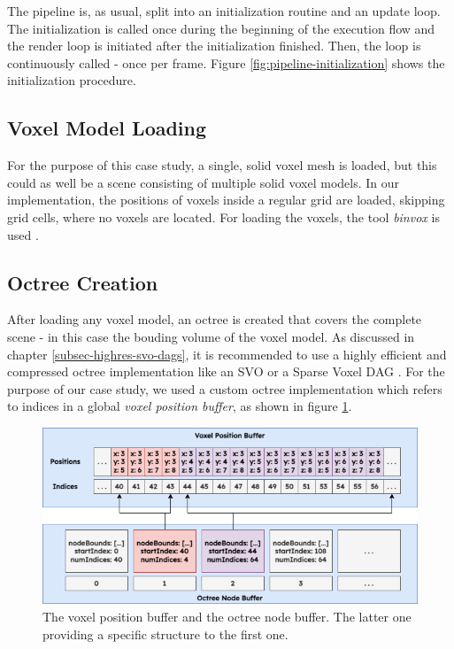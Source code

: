 \noindent
The pipeline is, as usual, split into an initialization routine and an update loop. The initialization is 
called once during the beginning of the execution flow and the render loop is initiated after the initialization 
finished. Then, the loop is continuously called - once per frame. Figure \ref{fig:pipeline-initialization} shows 
the initialization procedure. 

\subsection*{Voxel Model Loading} \label{subsec-voxel-model-loading}

For the purpose of this case study, a single, solid voxel mesh is loaded, but this could as well be a scene 
consisting of multiple solid voxel models. In our implementation, the positions of voxels inside a regular 
grid are loaded, skipping grid cells, where no voxels are located. For loading the voxels, the tool \emph{binvox} 
is used \cite{binvox, Nooruddin2003}. 


\subsection*{Octree Creation} \label{subsec-octree-creation}

After loading any voxel model, an octree is created that covers 
the complete scene - in this case the bouding volume of the voxel model. As discussed in chapter 
\ref{subsec-highres-svo-dags}, it is recommended to use a highly efficient and compressed octree 
implementation like an \ac{SVO} or a Sparse Voxel \ac{DAG} \cite{Kampe2013}. For the purpose of our case 
study, we used a custom octree implementation which refers to indices in a global \emph{voxel position buffer}, 
as shown in figure \ref{fig:voxelpos-octreenode-buffer}.\\

\begin{figure}[h]
    \centering
    \includegraphics[width=\linewidth]{images/graphics/voxelpos-octreenode-buffer.png}
    \caption{The voxel position buffer and the octree node buffer. The latter one providing a 
    specific structure to the first one.}
    \label{fig:voxelpos-octreenode-buffer}
\end{figure}

